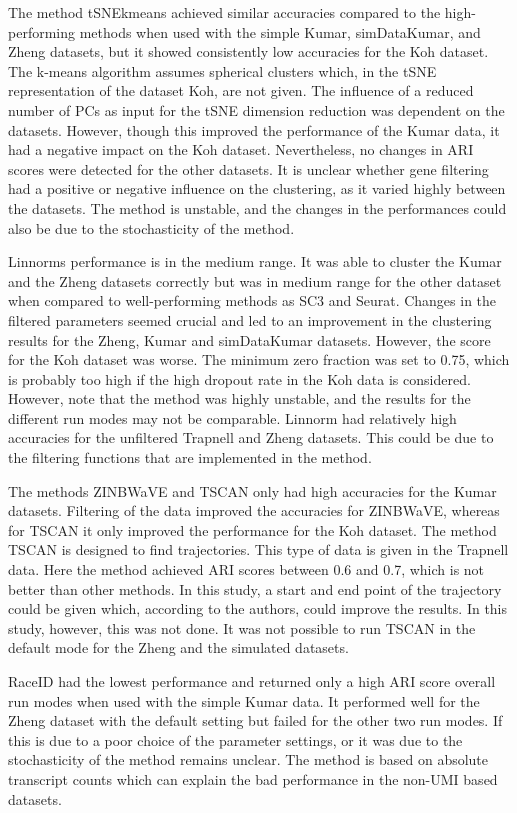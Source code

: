 \documentclass[12pt, a4paper]{article}\usepackage[]{graphicx}\usepackage[]{color}
\begin{document}
The method tSNEkmeans achieved similar accuracies compared to the high-performing methods when used with the simple Kumar, simDataKumar, and Zheng datasets, but it showed consistently low accuracies for the Koh dataset. The k-means algorithm assumes spherical clusters which, in the tSNE representation of the dataset Koh, are not given. The influence of a reduced number of PCs as input for the tSNE dimension reduction was dependent on the datasets. However, though this improved the performance of the Kumar data, it had a negative impact on the Koh dataset. Nevertheless, no changes in ARI scores were detected for the other datasets. It is unclear whether gene filtering had a positive or negative influence on the clustering, as it varied highly between the datasets. The method is unstable, and the changes in the performances could also be due to the stochasticity of the method.

Linnorms performance is in the medium range. It was able to cluster the Kumar and the Zheng datasets correctly but was in medium range for the other dataset when compared to well-performing methods as SC3 and Seurat. Changes in the filtered parameters seemed crucial and led to an improvement in the clustering results for the Zheng, Kumar and simDataKumar datasets. However, the score for the Koh dataset was worse. The minimum zero fraction was set to 0.75, which is probably too high if the high dropout rate in the Koh data is considered. However, note that the method was highly unstable, and the results for the different run modes may not be comparable. Linnorm had relatively high accuracies for the unfiltered Trapnell and Zheng datasets. This could be due to the filtering functions that are implemented in the method.

The methods ZINBWaVE and TSCAN only had high accuracies for the Kumar datasets. Filtering of the data improved the accuracies for ZINBWaVE, whereas for TSCAN it only improved the performance for the Koh dataset. The method TSCAN is designed to find trajectories. This type of data is given in the Trapnell data. Here the method achieved ARI scores between 0.6 and 0.7, which is not better than other methods. In this study, a start and end point of the trajectory could be given which, according to the authors, could improve the results. In this study, however, this was not done. It was not possible to run TSCAN in the default mode for the Zheng and the simulated datasets. 

RaceID had the lowest performance and returned only a high ARI score overall run modes when used with the simple Kumar data. It performed well for the Zheng dataset with the default setting but failed for the other two run modes. If this is due to a poor choice of the parameter settings, or it was due to the stochasticity of the method remains unclear. The method is based on absolute transcript counts which can explain the bad performance in the non-UMI based datasets.
\end{document}
